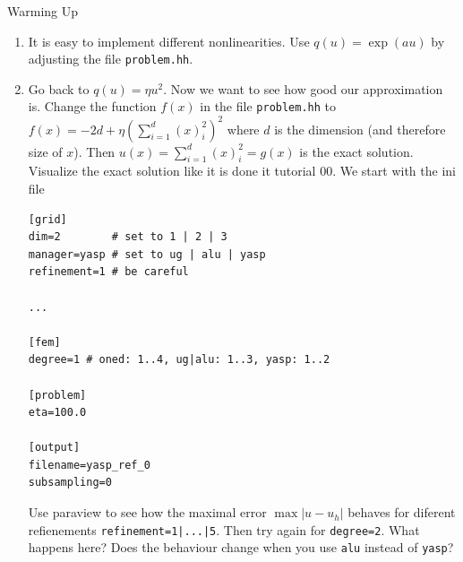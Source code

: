 \documentclass[12pt,a4paper]{article}
\begin{document}
\begin{Exercise}{Warming Up}
\begin{enumerate}
\begin{lstlisting}
[output]
filename=degree1_subsampling0
subsampling=0
\end{lstlisting}
    Try all combinations of \lstinline{degree=1|2} and
    \lstinline{subsampling=1|2} with appropriate
    \lstinline{filename}.  Look at your solutions using paraview and the
    \lstinline{warp by scalar} filter.  You can see the underlying grid
    by choosing \lstinline{surface with edges} instead of
    \lstinline{surface} in the parview drop down menu.  How does
    subsampling change the output?

  \item It is easy to implement different nonlinearities.  Use
    $q(u)=\exp(au)$ by adjusting the file \lstinline{problem.hh}.

  \item Go back to $q(u)=\eta u^2$.  Now we want to see how good our
    approximation is.  Change the function $f(x)$ in the file
    \lstinline{problem.hh} to $f(x)=-2d+\eta(\sum_{i=1}^d(x)_i^2)^2$
    where $d$ is the dimension (and therefore size of $x$).  Then
    $u(x)=\sum_{i=1}^d(x)_i^2=g(x)$ is the exact solution.  Visualize the
    exact solution like it is done it tutorial 00. We start with the
    ini file
    \begin{lstlisting}
[grid]
dim=2        # set to 1 | 2 | 3
manager=yasp # set to ug | alu | yasp
refinement=1 # be careful

...

[fem]
degree=1 # oned: 1..4, ug|alu: 1..3, yasp: 1..2

[problem]
eta=100.0

[output]
filename=yasp_ref_0
subsampling=0
    \end{lstlisting}
    Use paraview to see how the maximal error $\max|u-u_h|$ behaves
    for diferent refienements \lstinline{refinement=1|...|5}.  Then
    try again for \lstinline{degree=2}.  What happens here?  Does the
    behaviour change when you use \lstinline{alu} instead of
    \lstinline{yasp}?
  \end{enumerate}
\end{Exercise}
\end{document}
